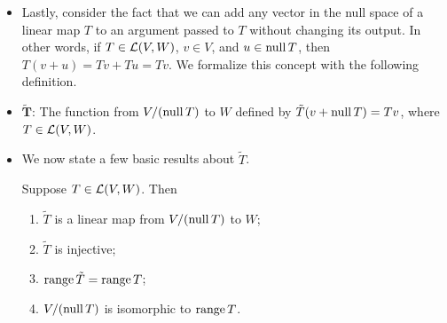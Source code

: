 \documentclass[../main.tex]{subfiles}
\begin{document}
\begin{itemize}
\begin{theorem}
\begin{proof}
            Let $\pi$ be the quotient map from $V$ to $V/U$. From Theorem \ref{trm:affineEquivalenceProperties}, we know that in order for $w+U=0+U$, we must have $v-0=v\in U$. Thus, $\pi(u)=0$ if and only if $u\in U$, meaning $\nul\pi=U$. Additionally, we clearly have that $\range\pi=V/U$. Therefore, by the \hyperref[trm:fundamentalTheoremLinearMaps]{Fundamental Theorem of Linear Maps}, we have that
            \begin{align*}
                \dim V &= \dim\nul\pi+\dim\range\pi\\
                &= \dim U+\dim V/U\\
                \dim V/U &= \dim V-\dim U
            \end{align*}
            as desired.
        \end{proof}
    \end{theorem}
    \item Lastly, consider the fact that we can add any vector in the null space of a linear map $T$ to an argument passed to $T$ without changing its output. In other words, if $T\in\mathcal{L}(V,W)$, $v\in V$, and $u\in\operatorname{null} T$, then $T(v+u)=Tv+Tu=Tv$. We formalize this concept with the following definition.
    \item $\bm{\tilde{T}}$: The function from $V/(\operatorname{null} T)$ to $W$ defined by $\tilde{T}(v+\operatorname{null} T)=Tv$, where $T\in\mathcal{L}(V,W)$.
    \item We now state a few basic results about $\tilde{T}$.
    \begin{theorem}
        Suppose $T\in\mathcal{L}(V,W)$. Then
        \begin{enumerate}[label={\textup{(}\alph*\textup{)}}]
            \item $\tilde{T}$ is a linear map from $V/(\operatorname{null} T)$ to $W$;
            \item $\tilde{T}$ is injective;
            \item $\operatorname{range}\tilde{T}=\operatorname{range} T$;
            \item $V/(\operatorname{null} T)$ is isomorphic to $\operatorname{range} T$.
        \end{enumerate}
    \end{theorem}
\end{itemize}
\end{document}
